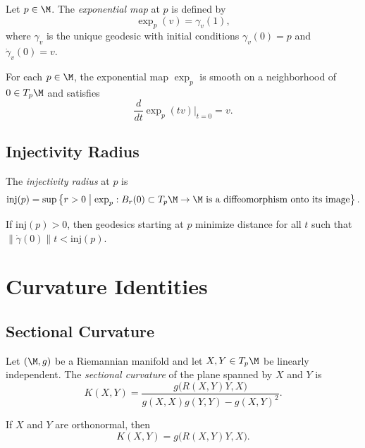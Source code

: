 \begin{definition}
Let $p \in \M$.  
The \emph{exponential map} at $p$ is defined by
\[
\exp_p(v) = \gamma_v(1),
\]
where $\gamma_v$ is the unique geodesic with initial conditions
$\gamma_v(0) = p$ and $\dot{\gamma}_v(0) = v$.
\end{definition}

\begin{theorem}
For each $p \in \M$, the exponential map $\exp_p$ is smooth on a
neighborhood of $0 \in T_p\M$ and satisfies
\[
\frac{d}{dt}\exp_p(tv)\bigg|_{t=0} = v.
\]
\end{theorem}

\subsection{Injectivity Radius}

\begin{definition}
The \emph{injectivity radius} at $p$ is
\[
\mathrm{inj}(p)
= \sup \left\{ r > 0 \;\middle|\; \exp_p : B_r(0) \subset T_p\M \to \M
\text{ is a diffeomorphism onto its image} \right\}.
\]
\end{definition}

\begin{lemma}
If $\mathrm{inj}(p) > 0$, then geodesics starting at $p$ minimize distance
for all $t$ such that $\|\dot{\gamma}(0)\| t < \mathrm{inj}(p)$.
\end{lemma}

\section{Curvature Identities}

\subsection{Sectional Curvature}

\begin{definition}
Let $(\M,g)$ be a Riemannian manifold and let $X,Y \in T_p\M$ be
linearly independent.  
The \emph{sectional curvature} of the plane spanned by $X$ and $Y$ is
\[
K(X,Y)
= \frac{g\big(R(X,Y)Y, X\big)}
       {g(X,X)g(Y,Y) - g(X,Y)^2}.
\]
\end{definition}

\begin{lemma}
If $X$ and $Y$ are orthonormal, then
\[
K(X,Y) = g\big(R(X,Y)Y, X\big).
\]
\end{lemma}

